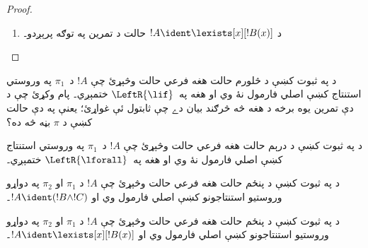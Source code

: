 \documentclass[../../../include/open-logic-section]{subfiles}
\begin{document}
\begin{proof}
\begin{enumerate}
!!{proof}~$\pi_1'$ وروستے سېکوېنټ $\Gamma \Sequent \Delta,
!B(c)$ لري، چې $c$~د~$\RightR{\lforall}$ د يوه استنتاج ځانګړے متغير دے۔ نو $c$~په~$!B(x)$، $\Gamma$ يا~$\Delta$ کښې نۀ راځي۔ فرض کوو چې !!{proof}~$\pi$ منظم دے: $c$~يوازې د ورپسې~$\RightR{\lforall}$ د استنتاج ځانګړے متغير دے او يوازې له هغه پورته راځي؛ يعنې يوازې په~$\pi_1'$ کښې راځي او په~$\pi_1'$ کښې د کوم استنتاج ځانګړے متغير نۀ دے۔ څرنګه چې $c$ په~$\pi_2$ کښې نۀ راځي، په~$t$ کښې هم نۀ شي راتلے۔ د  له مخې !!{proof}~$\Subst{\pi_1'}{t}{c}$ د $\Gamma \Sequent \Delta,
!B(t)$ يو !!a{proof} دے۔ اوس د استقرا فرض پر دې !!{proof} لګوو:
\[
\AxiomC{}
\RightLabel{$\Subst{\pi_1'}{t}{c}$}
\Deduce$\Gamma \fCenter \Delta, !B(t)$
\AxiomC{}
\RightLabel{$\pi_2''$}
\Deduce$!B(t), \Gamma \fCenter \Delta$
\RightLabel{\CutCS}
\BinaryInf$\Gamma \fCenter \Delta$
\DisplayProof
\]
د استقرا فرض لګېږي، ځکه د پرېکون !!{formula}~$!B(t)$ دے؛ نو دا !!{proof} له~$\pi$ څخه د پرېکون ټيټه رتبه لري۔
\item د $!A \ident \lexists[x][!B(x)]$ حالت د تمرين په توګه پرېږدو۔
\end{enumerate}
\end{proof}

\begin{prob}
د  په ثبوت کښې د څلورم حالت  هغه فرعي حالت وڅېړئ چې $!A$ د~$\pi_1$ په وروستي استنتاج کښې اصلي فارمول نۀ وي او هغه په~$\LeftR{\lif}$ ختمېږي۔ پام وکړئ چې د دې تمرين يوه برخه د هغه څه څرګند بيان دے چې ثابتول ئې غواړئ؛ يعنې په دې حالت کښې د $\pi$ بڼه څه ده؟
\end{prob}

\begin{prob}
د  په ثبوت کښې د درېم حالت  هغه فرعي حالت وڅېړئ چې $!A$ د~$\pi_1$ په وروستي استنتاج کښې اصلي فارمول نۀ وي او هغه په~$\LeftR{\lforall}$ ختمېږي۔
\end{prob}

\begin{prob}
د  په ثبوت کښې د پنځم حالت  هغه فرعي حالت وڅېړئ چې $!A$ د $\pi_1$ او $\pi_2$ په دواړو وروستيو استنتاجونو کښې اصلي فارمول وي او $!A \ident (!B \land !C)$۔
\end{prob}

\begin{prob}
د  په ثبوت کښې د پنځم حالت  هغه فرعي حالت وڅېړئ چې $!A$ د $\pi_1$ او $\pi_2$ په دواړو وروستيو استنتاجونو کښې اصلي فارمول وي او $!A \ident \lexists[x][!B(x)]$۔
\end{prob}
\end{document}
